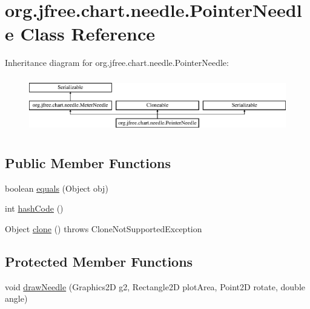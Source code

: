 \hypertarget{classorg_1_1jfree_1_1chart_1_1needle_1_1_pointer_needle}{}\section{org.\+jfree.\+chart.\+needle.\+Pointer\+Needle Class Reference}
\label{classorg_1_1jfree_1_1chart_1_1needle_1_1_pointer_needle}
Inheritance diagram for org.\+jfree.\+chart.\+needle.\+Pointer\+Needle\+:\begin{figure}[H]
\begin{center}
\leavevmode
\includegraphics[height=2.456140cm]{classorg_1_1jfree_1_1chart_1_1needle_1_1_pointer_needle}
\end{center}
\end{figure}
\subsection*{Public Member Functions}
\begin{DoxyCompactItemize}
\item 
boolean \mbox{\hyperlink{classorg_1_1jfree_1_1chart_1_1needle_1_1_pointer_needle_a2cc7cce1385cde49bbcce44a4b635247}{equals}} (Object obj)
\item 
int \mbox{\hyperlink{classorg_1_1jfree_1_1chart_1_1needle_1_1_pointer_needle_adef6060370666869e56ce897a60ad008}{hash\+Code}} ()
\item 
Object \mbox{\hyperlink{classorg_1_1jfree_1_1chart_1_1needle_1_1_pointer_needle_ab6eb5f42328f3e753a22d1a4e0b7c352}{clone}} ()  throws Clone\+Not\+Supported\+Exception 
\end{DoxyCompactItemize}
\subsection*{Protected Member Functions}
\begin{DoxyCompactItemize}
\item 
void \mbox{\hyperlink{classorg_1_1jfree_1_1chart_1_1needle_1_1_pointer_needle_a902169adf5137812f304441cbcbff759}{draw\+Needle}} (Graphics2D g2, Rectangle2D plot\+Area, Point2D rotate, double angle)
\end{DoxyCompactItemize}
